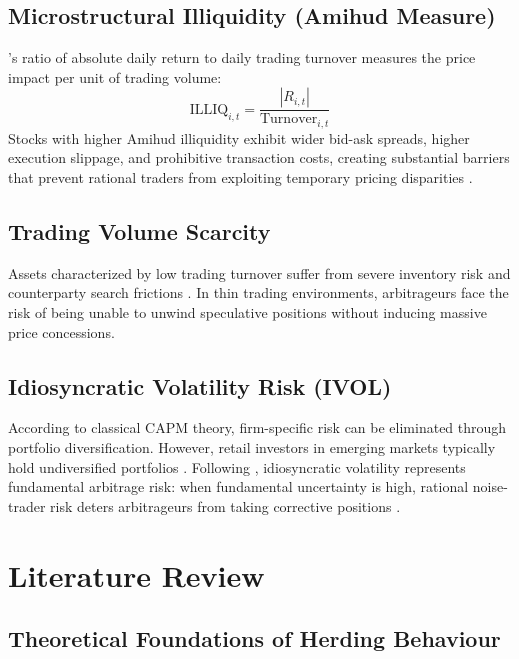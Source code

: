 \documentclass[12pt, a4paper]{article}
\begin{document}
\subsection{Microstructural Illiquidity (Amihud Measure)}

\citet{Amihud2002}'s ratio of absolute daily return to daily trading turnover measures the price impact per unit of trading volume:
\begin{equation}
  \mathrm{ILLIQ}_{i,t} = \frac{\left|R_{i,t}\right|}{\mathrm{Turnover}_{i,t}}
\end{equation}
Stocks with higher Amihud illiquidity exhibit wider bid-ask spreads, higher execution slippage, and prohibitive transaction costs, creating substantial barriers that prevent rational traders from exploiting temporary pricing disparities \citep{Chordia2008}.

\subsection{Trading Volume Scarcity}

Assets characterized by low trading turnover suffer from severe inventory risk and counterparty search frictions \citep{Mashruwala2006}. In thin trading environments, arbitrageurs face the risk of being unable to unwind speculative positions without inducing massive price concessions.

\subsection{Idiosyncratic Volatility Risk (IVOL)}

According to classical CAPM theory, firm-specific risk can be eliminated through portfolio diversification. However, retail investors in emerging markets typically hold undiversified portfolios \citep{Malkiel2002}. Following \citet{Stambaugh2015}, idiosyncratic volatility represents fundamental arbitrage risk: when fundamental uncertainty is high, rational noise-trader risk deters arbitrageurs from taking corrective positions \citep{Merton1987}.

\section{Literature Review}

\subsection{Theoretical Foundations of Herding Behaviour}
\end{document}
